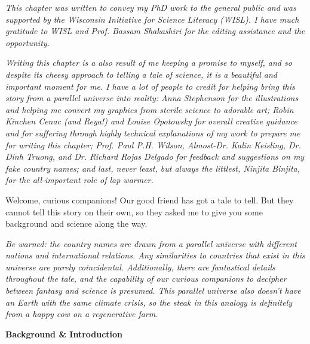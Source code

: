 {
\setlength{\parindent}{0pt}
\setlength{\parskip}{1em}

\begin{quoting}
  {
  \footnotesize
  
  \textit{This chapter was written to convey my PhD work to the general public
  and was supported by the Wisconsin Initiative for Science Literacy (WISL).  I
  have much gratitude to WISL and Prof. Bassam Shakashiri for the editing
  assistance and the opportunity.}
  
  \textit{Writing this chapter is a also result of me keeping a promise to
  myself, and so despite its cheesy approach to telling a tale of science, it
  is a beautiful and important moment for me. I have a lot of people to credit
  for helping bring this story from a parallel universe into reality: Anna
  Stephenson for the illustrations and helping me convert my graphics from
  sterile science to adorable art; Robin Kinchen Cenac (and Reya!) and Louise
  Opotowsky for overall creative guidance and for suffering through highly
  technical explanations of my work to prepare me for writing this chapter;
  Prof. Paul P.H. Wilson, Almost-Dr.  Kalin Keisling, Dr. Dinh Truong, and Dr.
  Richard Rojas Delgado for feedback and suggestions on my fake country names;
  and last, never least, but always the littlest, Ninjita Binjita, for the
  all-important role of lap warmer.} 
  
  }
\end{quoting}

\narr Welcome, curious companions! Our good friend has got a tale to tell.  But
they cannot tell this story on their own, so they asked me to give you some
background and science along the way.

\textit{Be warned: the country names are drawn from a parallel universe with
different nations and international relations. Any similarities to countries
that exist in this universe are purely coincidental. Additionally, there are
fantastical details throughout the tale, and the capability of our curious
companions to decipher between fantasy and science is presumed.  This parallel
universe also doesn't have an Earth with the same climate crisis, so the steak
in this analogy is definitely from a happy cow on a regenerative farm.}

\begin{tcolorbox}[halign=center]
\textbf{Background \& Introduction}
\end{tcolorbox}

}
